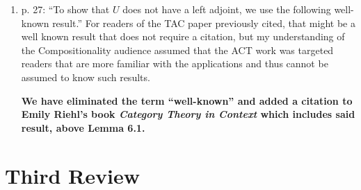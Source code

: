 \documentclass[reqno]{amsart}
\def\chris{\color{purple} Christina: }
\def\john{\color{red} John: }
\begin{document}
\begin{enumerate}
{\chris Thanks!}

\fi


\item p. 27: ``To show that $U$ does not have a left adjoint, we use the following well-known result.'' For readers of the TAC paper previously cited, 
that might 
be a well known result that does not require a citation, but my understanding of the Compositionality audience assumed that the ACT work was targeted 
readers that are more familiar with the applications and thus cannot be assumed to know such results.

{\bf We have eliminated the term ``well-known'' and added a citation to Emily Riehl's book \textsl{ Category Theory in Context} which includes said result, above Lemma 6.1.}  


 

\end{enumerate}

\section*{Third Review}
\end{document}
